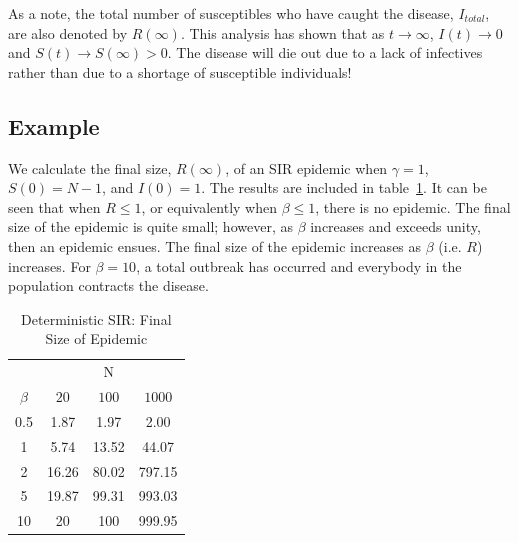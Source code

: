 \documentclass[reqno,11pt]{amsart}
\begin{document}
As a note, the total number of susceptibles who have caught the disease, $I_{total}$, are also denoted by $R(\infty)$. This analysis has shown that as $t \rightarrow \infty$, $I(t) \rightarrow  0$ and $S(t) \rightarrow S(\infty) > 0$. The disease will die out due to a lack of infectives rather than due to a shortage of susceptible individuals!
%
%
%
%
\subsection{Example} We calculate the final size, $R(\infty)$, of an SIR epidemic when $ \gamma =1$, $S(0) = N - 1 $, and $I(0)=1$. The results are included in table~\ref{Table_DetFinalSize}. It can be seen that when $R \le 1$, or equivalently when $\beta \le 1$, there is no epidemic. The final size of the epidemic is quite small; however, as $\beta$ increases and exceeds unity, then an epidemic ensues. The final size of the epidemic increases as $\beta$ (i.e. $R$) increases. For $\beta = 10$, a total outbreak has occurred and everybody in the population contracts the disease.
\begin{table}[ht]
	\begin{tabular}{|c||ccc|}
		\hline
	 	   &           &    N       &			\\ \cline{2-4}
	$\beta$ &  $20$ & $100$  	& $1000$   		\\
	\hline
	0.5 & 1.87	& 1.97 		& 2.00   	\\
	1   & 5.74 	& 13.52 	& 44.07  		\\
	2   & 16.26 	& 80.02 	& 797.15 		\\
	5   & 19.87 	& 99.31 	& 993.03  		\\
	10  & 20 	& 100 		& 999.95  		\\
	\hline
	\end{tabular}
	\caption{Deterministic SIR: Final Size of Epidemic}
	\label{Table_DetFinalSize}
\end{table}
%
%
%
%
\end{document}
